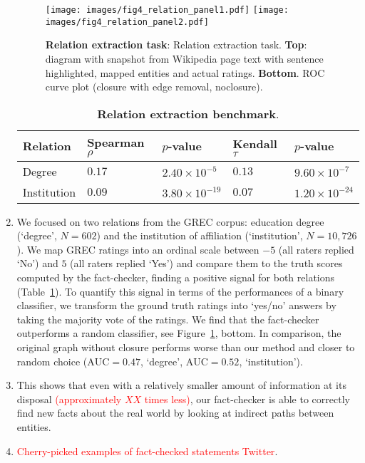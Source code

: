 \documentclass[10pt, letterpaper, english]{nature}
\begin{document}
\begin{enumerate}
    \begin{figure} \centering
        \texttt{[image: images/fig4\_relation\_panel1.pdf]}
        \texttt{[image: images/fig4\_relation\_panel2.pdf]}
        \caption{\textbf{Relation extraction task}: Relation extraction task.
        \textbf{Top}: diagram with snapshot from Wikipedia page text with
        sentence highlighted, mapped entities and actual ratings.
        \textbf{Bottom}. ROC curve plot (closure with edge removal, noclosure).}
        \label{fig:fig4_relation} \end{figure}

\begin{table}
    \centering
    \begin{tabular}{lllll}
        \toprule
        Relation & Spearman $\rho$ & $p$-value & Kendall $\tau$ & $p$-value \\
        \midrule
        Degree & $0.17$ & $2.40\times 10^{-5}$ & $0.13$ & $9.60\times 10^{-7}$ \\
        Institution & $0.09$ & $3.80\times 10^{-19}$ & $0.07$ & $1.20\times 10^{-24}$ \\
        \bottomrule
    \end{tabular}
    \caption{\textbf{Relation extraction benchmark}.}
    \label{tab:relation}
\end{table}

    \item We focused on two relations from the GREC corpus: education degree
        (`degree', $N = 602$) and the institution of affiliation (`institution',
        $N = 10,726$). We map GREC ratings into an ordinal scale between $-5$
        (all raters replied `No') and $5$ (all raters replied `Yes') and compare
        them to the truth scores computed by the fact-checker, finding a
        positive signal for both relations (Table~\ref{tab:relation}). To
        quantify this signal in terms of the performances of a binary
        classifier, we transform the ground truth ratings into `yes/no' answers
        by taking the majority vote of the ratings. We find that the
        fact-checker outperforms a random classifier, see
        Figure~\ref{fig:fig4_relation}, bottom. In comparison, the original
        graph without closure performs worse than our method and closer to
        random choice ($\mathrm{AUC} = 0.47$, `degree', $\mathrm{AUC} = 0.52$,
        `institution').
    
    \item This shows that even with a relatively smaller amount of information
        at its disposal \textcolor{red}{(approximately $XX$ times less)}, our
        fact-checker is able to correctly find new facts about the real world by
        looking at indirect paths between entities. 

    \item \textcolor{red}{Cherry-picked examples of fact-checked statements
        Twitter}.
        
\end{enumerate}
\end{document}
